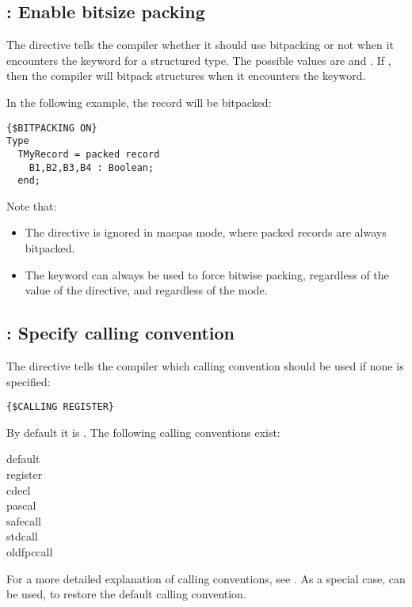 \subsection{ : Enable bitsize packing}
\label{se:dirbitpacking}
The  directive tells the compiler whether
it should use bitpacking or not when it encounters the 
keyword for a structured type. The possible values are  and
. If , then the compiler will bitpack structures when it
encounters the  keyword.

In the following example, the  record will be bitpacked:
\begin{verbatim}
{$BITPACKING ON}
Type
  TMyRecord = packed record
    B1,B2,B3,B4 : Boolean;
  end;
\end{verbatim}

Note that:
\begin{itemize}
\item The  directive is ignored in macpas mode, where
packed records are always bitpacked.
\item The  keyword can always be used to force bitwise
packing, regardless of the value of the  directive, and
regardless of the mode.
\end{itemize}

\subsection{ : Specify calling convention}
\label{se:dircalling}
The  directive tells the compiler which calling 
convention should be used if none is specified:
\begin{verbatim}
{$CALLING REGISTER}
\end{verbatim}
 By default it is . The following calling conventions exist:
\begin{description}
\item[default]
\item[register]
\item[cdecl]
\item[pascal]
\item[safecall]
\item[stdcall]
\item[oldfpccall]
\end{description}
For a more detailed explanation of calling conventions, see .
As a special case,  can be used, to restore the default calling
convention.

